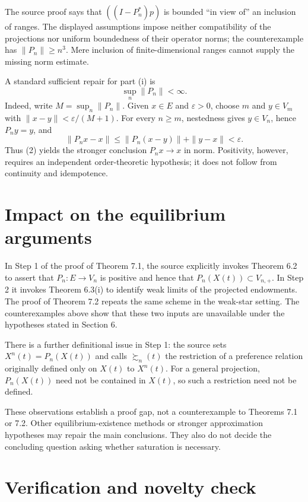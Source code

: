 \documentclass[11pt]{article}
\begin{document}
The source proof says that \(((I-P_n^*)p)\) is bounded ``in view of'' an
inclusion of ranges.  The displayed assumptions impose neither compatibility
of the projections nor uniform boundedness of their operator norms; the
counterexample has \(\|P_n\|\ge n^3\).  Mere inclusion of finite-dimensional
ranges cannot supply the missing norm estimate.

A standard sufficient repair for part (i) is
\[
  \sup_n\|P_n\|<\infty.
  \tag{2}
\]
Indeed, write \(M=\sup_n\|P_n\|\).  Given \(x\in E\) and \(\varepsilon>0\),
choose \(m\) and \(y\in V_m\) with \(\|x-y\|<\varepsilon/(M+1)\).
For every \(n\ge m\), nestedness gives \(y\in V_n\), hence \(P_ny=y\), and
\[
 \|P_nx-x\|
 \le \|P_n(x-y)\|+\|y-x\|
 <\varepsilon.
\]
Thus (2) yields the stronger conclusion \(P_nx\to x\) in norm.  Positivity,
however, requires an independent order-theoretic hypothesis; it does not
follow from continuity and idempotence.

\section{Impact on the equilibrium arguments}

In Step 1 of the proof of Theorem 7.1, the source explicitly invokes
Theorem 6.2 to assert that \(P_n:E\to V_n\) is positive and hence that
\(P_n(X(t))\subset V_{n,+}\).  In Step 2 it invokes Theorem 6.3(i) to identify
weak limits of the projected endowments.  The proof of Theorem 7.2 repeats
the same scheme in the weak-star setting.  The counterexamples above show
that these two inputs are unavailable under the hypotheses stated in
Section 6.

There is a further definitional issue in Step 1: the source sets
\(X^n(t)=P_n(X(t))\) and calls \(\succsim_n(t)\) the restriction of a
preference relation originally defined only on \(X(t)\) to
\(X^n(t)\).  For a general projection, \(P_n(X(t))\) need not be contained in
\(X(t)\), so such a restriction need not be defined.

These observations establish a proof gap, not a counterexample to Theorems
7.1 or 7.2.  Other equilibrium-existence methods or stronger approximation
hypotheses may repair the main conclusions.  They also do not decide the
concluding question asking whether saturation is necessary.

\section{Verification and novelty check}
\end{document}
